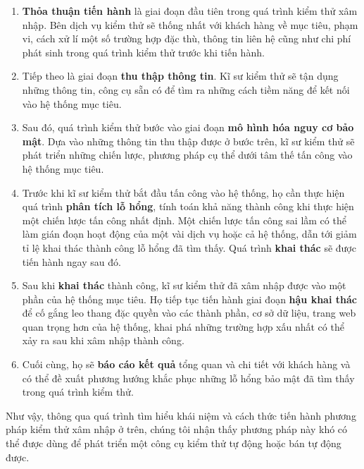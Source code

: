\begin{enumerate}
    \item \textbf{Thỏa thuận tiến hành} là giai đoạn đầu tiên trong quá trình kiểm thử xâm nhập. Bên dịch vụ kiểm thử sẽ thống nhất với khách hàng về mục tiêu, phạm vi, cách xử lí một số trường hợp đặc thù, thông tin liên hệ cũng như chi phí phát sinh trong quá trình kiểm thử trước khi tiến hành.
    \item Tiếp theo là giai đoạn \textbf{thu thập thông tin}. Kĩ sư kiểm thử sẽ tận dụng những thông tin, công cụ sẵn có để tìm ra những cách tiềm năng để kết nối vào hệ thống mục tiêu.
    \item Sau đó, quá trình kiểm thử bước vào giai đoạn \textbf{mô hình hóa nguy cơ bảo mật}. Dựa vào những thông tin thu thập được ở bước trên, kĩ sư kiểm thử sẽ phát triển những chiến lược, phương pháp cụ thể dưới tâm thế tấn công vào hệ thống mục tiêu.
    \item Trước khi kĩ sư kiểm thử bắt đầu tấn công vào hệ thống, họ cần thực hiện quá trình \textbf{phân tích lỗ hổng}, tính toán khả năng thành công khi thực hiện một chiến lược tấn công nhất định. Một chiến lược tấn công sai lầm có thể làm gián đoạn hoạt động của một vài dịch vụ hoặc cả hệ thống, dẫn tới giảm tỉ lệ khai thác thành công lỗ hổng đã tìm thấy. Quá trình \textbf{khai thác} sẽ được tiến hành ngay sau đó.
    \item Sau khi \textbf{khai thác} thành công, kĩ sư kiểm thử đã xâm nhập được vào một phần của hệ thống mục tiêu. Họ tiếp tục tiến hành giai đoạn \textbf{hậu khai thác} để cố gắng leo thang đặc quyền vào các thành phần, cơ sở dữ liệu, trang web quan trọng hơn của hệ thống, khai phá những trường hợp xấu nhất có thể xảy ra sau khi xâm nhập thành công.
    \item Cuối cùng, họ sẽ \textbf{báo cáo kết quả} tổng quan và chi tiết với khách hàng và có thể đề xuất phương hướng khắc phục những lỗ hổng bảo mật đã tìm thấy trong quá trình kiểm thử.
\end{enumerate}
Như vậy, thông qua quá trình tìm hiểu khái niệm và cách thức tiến hành phương pháp kiểm thử xâm nhập ở trên, chúng tôi nhận thấy phương pháp này khó có thể được dùng để phát triển một công cụ kiểm thử tự động hoặc bán tự động được.
